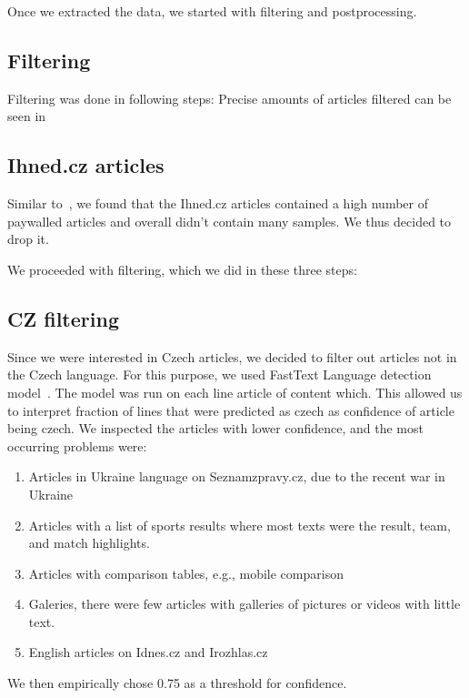 \begin{itemize}
Once we extracted the data, we started with filtering and postprocessing.
\subsection{Filtering}

Filtering was done in following steps:
Precise amounts of articles filtered can be seen in



\subsection{Ihned.cz articles}
Similar to~\cite{strakaSumeCzechLargeCzech2018a}, we found that the Ihned.cz articles contained
a high number of paywalled articles and overall didn't contain many samples.
We thus decided to drop it.

We proceeded with filtering, which we did in these three steps:
\subsection{CZ filtering}
Since we were interested in Czech articles, we decided to filter out articles
not in the Czech language. For this purpose,
we used FastText Language detection model~\cite{joulinFastTextZipCompressing2016,joulinBagTricksEfficient2016}. The model was run on each line article of content which. This allowed us to interpret fraction of lines that were predicted as czech as confidence of article being czech.
We inspected the articles with lower confidence, and the most occurring problems were:
\begin{enumerate}
    \item Articles in Ukraine language on Seznamzpravy.cz, due to the recent war in Ukraine
    \item Articles with a list of sports results where most texts were
    the result, team, and match highlights.
    \item Articles with comparison tables, e.g., mobile comparison
    \item Galeries, there were few articles with galleries of pictures or videos with little text.
    \item English articles on Idnes.cz and Irozhlas.cz
\end{enumerate}
We then empirically chose 0.75 as a threshold for confidence.


\end{itemize}
